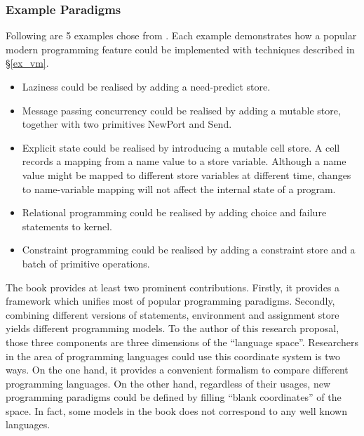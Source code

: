 \subsubsection{Example Paradigms}
Following are 5 examples chose from \cite{roy}.  Each example demonstrates how a popular modern programming feature could be implemented with techniques described in \S \ref{ex_vm}.
\begin{itemize}
  \item Laziness could be realised by adding a need-predict store.
  \item Message passing concurrency could be realised by adding a mutable store, together with two primitives NewPort and Send.
  \item Explicit state could be realised by introducing a mutable cell store.  A cell records a mapping from a name value to a store variable.  Although a name value might be mapped to different store variables at different time, changes to name-variable mapping will not affect the internal state of a program.
  \item Relational programming could be realised by adding choice and failure statements to kernel.
  \item  Constraint programming could be realised by adding a constraint store and a batch of primitive operations.
\end{itemize}


The book  \cite{roy} provides at least two prominent contributions.  Firstly, it provides a framework which unifies most of popular programming paradigms.  Secondly, combining different versions of statements, environment and assignment store yields different programming models.  To the author of this research proposal,  those three components  are three dimensions of the ``language space''.  Researchers in the area of programming languages could use this coordinate system is two ways.  On the one hand, it provides a convenient formalism to compare different programming languages.  On the other hand, regardless of their usages,  new programming paradigms could be defined by filling ``blank coordinates'' of the space.  In fact, some models in the book does not correspond to any well known languages.